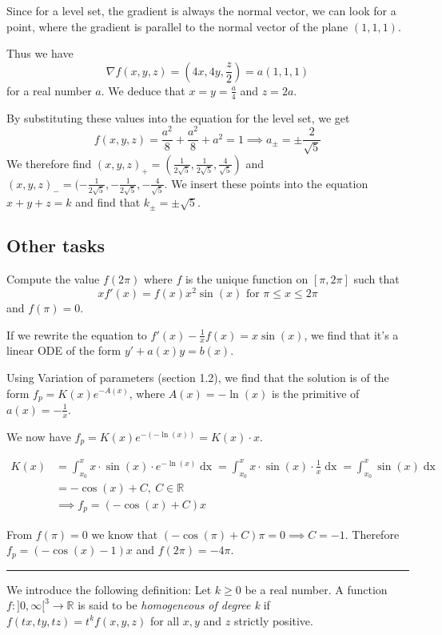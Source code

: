 \documentclass[a4paper,fontsize = 10pt]{article}
\def\R{\mathbb{R}}
\begin{document}
Since for a level set, the gradient is always the normal vector, we can look for a point, where the gradient is parallel to the normal vector of the plane $(1,1,1)$.

Thus we have 
\[\nabla f (x,y,z) = \left(4x,4y,\frac{z}{2}\right) = a (1,1,1)\]
for a real number $a$. We deduce that $x = y = \frac{a}{4}$ and $z = 2a$.

By substituting these values into the equation for the level set, we get 
\[f(x,y,z) = \frac{a^2}{8} + \frac{a^2}{8} + a^2 = 1 \implies a_{\pm} = \pm \frac{2}{\sqrt{5}}\]
We therefore find \((x,y,z)_+ = (\frac{1}{2\sqrt{5}}, \frac{1}{2\sqrt{5}}, \frac{4}{\sqrt{5}})\) and \((x,y,z)_- = (-\frac{1}{2\sqrt{5}}, -\frac{1}{2\sqrt{5}}, -\frac{4}{\sqrt{5}}\).
We insert these points into the equation $x + y + z = k$ and find that $k_\pm = \pm \sqrt{5}$.
\subsection{Other tasks}

Compute the value $f(2\pi)$ where $f$ is the unique function on $[\pi, 2\pi]$ such that 
\[xf'(x) = f(x) x^2\sin(x) \text{ for } \pi \leq x \leq 2\pi\]
and $f(\pi) = 0$.

\vspace{0.1cm}
If we rewrite the equation to \(f'(x) - \frac{1}{x}f(x) = x \sin(x)\), we find that it's a linear ODE of the form $y' + a(x)y = b(x)$.

Using Variation of parameters (section 1.2), we find that the solution is of the form \(f_p = K(x) e^{-A(x)}\), where $A(x) = -\ln(x)$ is the primitive of $a(x) = -\frac{1}{x}$.

We now have \(f_p = K(x) e^{-(-\ln(x))} = K(x) \cdot x\).

\begin{align*}
  K(x) &= \int_{x_0}^x x\cdot \sin(x) \cdot e^{-\ln(x)} \mathop{dx} = \int_{x_0}^x x\cdot \sin(x) \cdot \frac{1}{x} \mathop{dx} =  \int_{x_0}^x \sin(x) \mathop{dx}\\
  &= -\cos(x) + C, \ C \in \R\\
  &\implies f_p = (-\cos(x) + C)x
\end{align*}

From $f(\pi) = 0$ we know that $(-\cos(\pi) + C) \pi = 0 \implies C = -1$. Therefore $f_p = (-\cos(x) - 1)x$ and $f(2\pi) = -4 \pi$.

\vspace{0.1 cm}
\hrule
\vspace{0.2 cm}
We introduce the following definition: Let $k \geq 0$ be a real number. A function $f : ]0, \infty[^3 \to \R$ is said to be \textit{homogeneous of degree k} if $f (tx, ty, tz) =t^k f(x, y, z)$ for all $x, y$ and $z$ strictly positive. 
\end{document}
